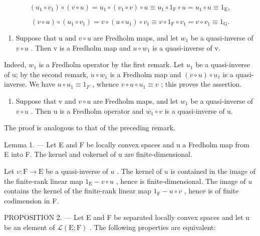 \[
\left(u _ {1} \circ v _ {1}\right) \circ (v \circ u) = u _ {1} \circ \left(v _ {1} \circ v\right) \circ u \equiv u _ {1} \circ 1 _ {\mathrm{F}} \circ u = u _ {1} \circ u \equiv 1 _ {\mathrm{E}},
\]

\[
(v \circ u) \circ (u _ {1} \circ v _ {1}) = v \circ (u \circ u _ {1}) \circ v _ {1} \equiv v \circ 1 _ {\mathrm{F}} \circ v _ {1} = v \circ v _ {1} \equiv 1 _ {\mathrm{G}}.
\]

\begin{enumerate}
\def\labelenumi{\arabic{enumi})}
\setcounter{enumi}{2}
\tightlist
\item
  Suppose that u and \(v \circ u\) are Fredholm maps, and let \(w_{1}\) be a quasi-inverse of \(v \circ u\) . Then v is a Fredholm map and \(u \circ w_{1}\) is a quasi-inverse of v.
\end{enumerate}

Indeed, \(w_{1}\) is a Fredholm operator by the first remark. Let \(u_{1}\) be a quasi-inverse of u; by the second remark, \(u \circ w_{1}\) is a Fredholm map and \((v \circ u) \circ u_{1}\) is a quasi-inverse. We have \(u \circ u_{1} \equiv 1_{F}\) , whence \(v \circ u \circ u_{1} \equiv v\) ; this proves the assertion.

\begin{enumerate}
\def\labelenumi{\arabic{enumi})}
\setcounter{enumi}{3}
\tightlist
\item
  Suppose that v and \(v \circ u\) are Fredholm maps, and let \(w_{1}\) be a quasi-inverse of \(v \circ u\) . Then u is a Fredholm operator and \(w_{1} \circ v\) is a quasi-inverse of u.
\end{enumerate}

The proof is analogous to that of the preceding remark.

Lemma 1. --- Let E and F be locally convex spaces and u a Fredholm map from E into F. The kernel and cokernel of u are finite-dimensional.

Let \(v \colon \mathrm{F} \to \mathrm{E}\) be a quasi-inverse of \(u\) . The kernel of \(u\) is contained in the image of the finite-rank linear map \(1_{\mathrm{E}} - v \circ u\) , hence is finite-dimensional. The image of \(u\) contains the kernel of the finite-rank linear map \(1_{\mathrm{F}} - u \circ v\) , hence is of finite codimension in F.

PROPOSITION 2. — Let E and F be separated locally convex spaces and let u be an element of \(\mathcal{L}(\mathrm{E};\mathrm{F})\) . The following properties are equivalent:

